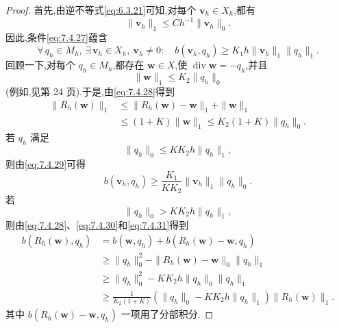 \begin{proof}
首先,由逆不等式\eqref{eq:6.3.21}可知,对每个 \(\boldsymbol{v}_h\in X_h\),都有
\[
  \|\boldsymbol{v}_h\|_1\le Ch^{-1}\|\boldsymbol{v}_h\|_0.
\]
因此,条件\eqref{eq:7.4.27}蕴含
\begin{equation}\label{eq:7.4.29}
  \forall\,q_h\in M_h,\ \exists\,\boldsymbol{v}_h\in X_h,\ \boldsymbol{v}_h\ne0:\quad
     b(\boldsymbol{v}_h,q_h)\ge K_1h\|\boldsymbol{v}_h\|_1\|q_h\|_1.
\end{equation}
回顾一下,对每个 \(q_h\in M_h\),都存在 \(\boldsymbol{w}\in X\),使 \(\operatorname{div}\boldsymbol{w}=-q_h\),并且
\begin{equation}\label{eq:7.4.30}
  \|\boldsymbol{w}\|_1\le K_2\|q_h\|_0
\end{equation}
(例如,见第 24 页).于是,由\eqref{eq:7.4.28}得到
\begin{equation}\label{eq:7.4.31}
  \begin{aligned}
    \|R_h(\boldsymbol{w})\|_1
      &\le\|R_h(\boldsymbol{w})-\boldsymbol{w}\|_1+\|\boldsymbol{w}\|_1\\
      &\le(1+K)\|\boldsymbol{w}\|_1\le K_2(1+K)\|q_h\|_0.
  \end{aligned}
\end{equation}
若 \(q_h\) 满足
\begin{equation}\label{eq:7.4.32}
  \|q_h\|_0\le KK_2h\|q_h\|_1,
\end{equation}
则由\eqref{eq:7.4.29}可得
\begin{equation}\label{eq:7.4.33}
  b(\boldsymbol{v}_h,q_h)\ge\frac{K_1}{KK_2}\|\boldsymbol{v}_h\|_1\|q_h\|_0.
\end{equation}
若
\begin{equation}\label{eq:7.4.34}
  \|q_h\|_0>KK_2h\|q_h\|_1,
\end{equation}
则由\eqref{eq:7.4.28}、\eqref{eq:7.4.30}和\eqref{eq:7.4.31}得到
\begin{equation}\label{eq:7.4.35}
  \begin{aligned}
    b(R_h(\boldsymbol{w}),q_h)
      &=b(\boldsymbol{w},q_h)+b(R_h(\boldsymbol{w})-\boldsymbol{w},q_h)\\
      &\ge\|q_h\|_0^2-\|R_h(\boldsymbol{w})-\boldsymbol{w}\|_0\|q_h\|_1\\
      &\ge\|q_h\|_0^2-KK_2h\|q_h\|_0\|q_h\|_1\\
      &\ge\frac{1}{K_2(1+K)}
         (\|q_h\|_0-KK_2h\|q_h\|_1)\|R_h(\boldsymbol{w})\|_1.
  \end{aligned}
\end{equation}
其中 \(b(R_h(\boldsymbol{w})-\boldsymbol{w},q_h)\) 一项用了分部积分.


\end{proof}
